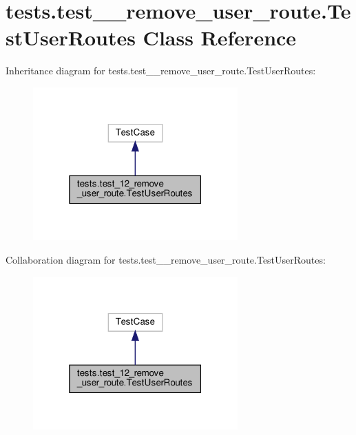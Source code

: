 \hypertarget{classtests_1_1test__12__remove__user__route_1_1_test_user_routes}{}\section{tests.\+test\+\_\+\_\+remove\+\_\+user\+\_\+route.\+Test\+User\+Routes Class Reference}
\label{classtests_1_1test__12__remove__user__route_1_1_test_user_routes}


Inheritance diagram for tests.\+test\+\_\+\_\+remove\+\_\+user\+\_\+route.\+Test\+User\+Routes\+:\nopagebreak
\begin{figure}[H]
\begin{center}
\leavevmode
\includegraphics[width=223pt]{classtests_1_1test__12__remove__user__route_1_1_test_user_routes__inherit__graph}
\end{center}
\end{figure}


Collaboration diagram for tests.\+test\+\_\+\_\+remove\+\_\+user\+\_\+route.\+Test\+User\+Routes\+:\nopagebreak
\begin{figure}[H]
\begin{center}
\leavevmode
\includegraphics[width=223pt]{classtests_1_1test__12__remove__user__route_1_1_test_user_routes__coll__graph}
\end{center}
\end{figure}

